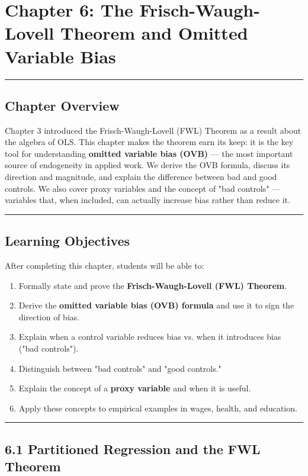\chapter{Chapter 6: The Frisch-Waugh-Lovell Theorem and Omitted Variable Bias}

\medskip\hrule\medskip

\section{Chapter Overview}

Chapter 3 introduced the Frisch-Waugh-Lovell (FWL) Theorem as a result about the algebra of OLS. This chapter makes the theorem earn its keep: it is the key tool for understanding \textbf{omitted variable bias (OVB)} --- the most important source of endogeneity in applied work. We derive the OVB formula, discuss its direction and magnitude, and explain the difference between bad and good controls. We also cover proxy variables and the concept of "bad controls" --- variables that, when included, can actually increase bias rather than reduce it.

\medskip\hrule\medskip

\section{Learning Objectives}

After completing this chapter, students will be able to:

\begin{enumerate}
\item Formally state and prove the \textbf{Frisch-Waugh-Lovell (FWL) Theorem}.
\item Derive the \textbf{omitted variable bias (OVB) formula} and use it to sign the direction of bias.
\item Explain when a control variable reduces bias vs. when it introduces bias ("bad controls").
\item Distinguish between "bad controls" and "good controls."
\item Explain the concept of a \textbf{proxy variable} and when it is useful.
\item Apply these concepts to empirical examples in wages, health, and education.
\end{enumerate}

\medskip\hrule\medskip

\section{6.1 Partitioned Regression and the FWL Theorem}

